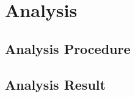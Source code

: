 \chapter{Analysis}
\label{chapter:analysis}

\section{Analysis Procedure}
\label{sec:analysis:procedure}


\section{Analysis Result}
\label{sec:analysis:result}

